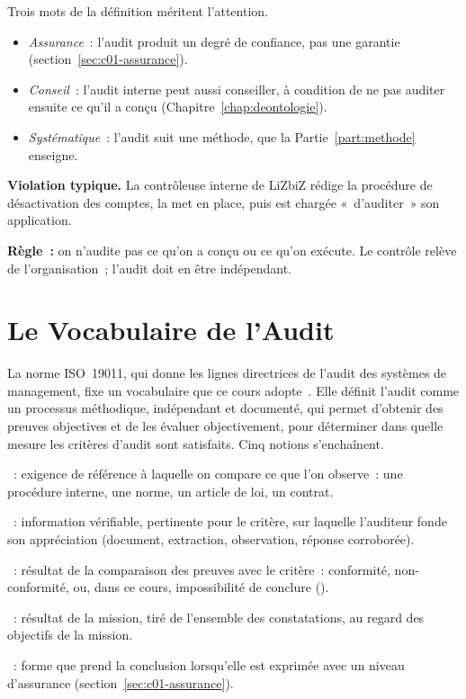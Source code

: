 Trois mots de la définition méritent l'attention.
\begin{itemize}
    \item \emph{Assurance}~: l'audit produit un degré de confiance, pas une
          garantie (section~\ref{sec:c01-assurance}).
    \item \emph{Conseil}~: l'audit interne peut aussi conseiller, à
          condition de ne pas auditer ensuite ce qu'il a conçu
          (Chapitre~\ref{chap:deontologie}).
    \item \emph{Systématique}~: l'audit suit une méthode, que la
          Partie~\ref{part:methode} enseigne.
\end{itemize}

\begin{boxalert}
\textbf{Violation typique.} La contrôleuse interne de LiZbiZ rédige la
procédure de désactivation des comptes, la met en place, puis est chargée
«~d'auditer~» son application.

\smallskip
\textbf{Règle~:} on n'audite pas ce qu'on a conçu ou ce qu'on exécute. Le
contrôle relève de l'organisation~; l'audit doit en être indépendant.
\end{boxalert}

\section{Le Vocabulaire de l'Audit}
\label{sec:c01-vocabulaire}

La norme ISO~19011, qui donne les lignes directrices de l'audit des
systèmes de management, fixe un vocabulaire que ce cours
adopte~\cite{iso19011_2018}. Elle définit l'audit comme un processus
méthodique, indépendant et documenté, qui permet d'obtenir des preuves
objectives et de les évaluer objectivement, pour déterminer dans quelle
mesure les critères d'audit sont satisfaits. Cinq notions s'enchaînent.

\begin{boxdef}
~: exigence de référence à
laquelle on compare ce que l'on observe~: une procédure interne, une
norme, un article de loi, un contrat.

\medskip
{}~: information vérifiable,
pertinente pour le critère, sur laquelle l'auditeur fonde son appréciation
(document, extraction, observation, réponse corroborée).

\medskip
{}~: résultat de la
comparaison des preuves avec le critère~: conformité, non-conformité, ou,
dans ce cours, impossibilité de conclure (\NEK{}).

\medskip
{}~: résultat de la
mission, tiré de l'ensemble des constatations, au regard des objectifs de
la mission.

\medskip
{}~: forme que prend la
conclusion lorsqu'elle est exprimée avec un niveau d'assurance
(section~\ref{sec:c01-assurance}).
\end{boxdef}


